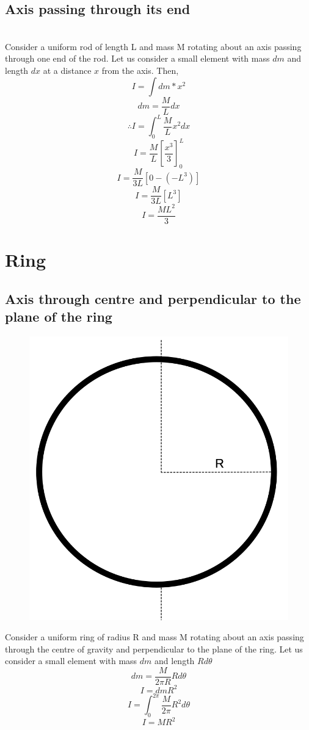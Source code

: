 \documentclass{article}
\begin{document}
\subsection{Axis passing through its end}
\\
Consider a uniform rod of length L and mass M rotating about an axis passing through one end of the rod.
Let us consider a small element with mass $dm$ and length $dx$ at a distance $x$ from the axis. Then,
$$I = \int dm*x^2$$
$$dm = \frac{M}{L} dx$$
$$\therefore I = \int_{0}^{L} \frac{M}{L} x^2 dx$$
$$ I = \frac{M}{L} \left[ \frac{x^3}{3} \right]_{0}^{L}$$
$$ I = \frac{M}{3L} \left[ 0 - \left( -L^3\right) \right]$$
$$ I = \frac{M}{3L} \left[ L^3 \right]$$
$$ \boxed{I = \frac{ML^2}{3}} $$

\section{Ring}
\subsection{Axis through centre and perpendicular to the plane of the ring}
\begin{figure}[h!]
  \centering
  \includegraphics[scale=0.3]{ring1.png}
\end{figure}
Consider a uniform ring of radius R and mass M rotating about an axis passing through the centre of gravity and perpendicular to the plane of the ring.
Let us consider a small element with mass $dm$ and length $Rd\theta$
$$dm = \frac{M}{2\pi R} Rd\theta$$
$$I = dm R^2$$
$$I = \int_{0}^{2\pi} \frac{M}{2\pi} R^2 d\theta$$
$$\boxed{I = MR^2}$$
\end{document}
